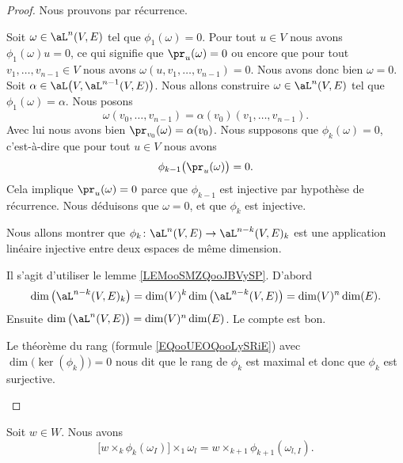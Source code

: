 \begin{proof}
	Nous prouvons par récurrence.
	\begin{subproof}
		\spitem[Injective, \( k=1\)]
		Soit \( \omega\in \aL^n(V,E)\) tel que \( \phi_1(\omega)=0\). Pour tout \( u\in V\) nous avons \( \phi_1(\omega)u=0\), ce qui signifie que \( \pr_u(\omega)=0\) ou encore que pour tout \( v_1,\ldots, v_{n-1}\in V\) nous avons \( \omega(u,v_1,\ldots, v_{n-1})=0\). Nous avons donc bien \( \omega=0\).
		\spitem[Surjective, \( k=1\)]
		Soit \( \alpha\in\aL\big( V,\aL^{n-1}(V,E) \big)\). Nous allons construire \( \omega\in \aL^n(V,E)\) tel que \( \phi_1(\omega)=\alpha\). Nous posons
		\begin{equation}
			\omega(v_0,\ldots, v_{n-1})=\alpha(v_0)(v_1,\ldots, v_{n-1}).
		\end{equation}
		Avec lui nous avons bien \( \pr_{v_0}(\omega)=\alpha(v_0)\).
		\spitem[Injective, \( k=k\)]
		Nous supposons que \( \phi_k(\omega)=0\), c'est-à-dire que pour tout \( u\in V\) nous avons
		\begin{equation}
			\phi_{k-1}\big( \pr_u(\omega) \big)=0.
		\end{equation}
		Cela implique \( \pr_u(\omega)=0\) parce que \( \phi_{k-1}\) est injective par hypothèse de récurrence. Nous déduisons que \( \omega=0\), et que \( \phi_k\) est injective.

		\spitem[Surjective, \( k=k\)]
		Nous allons montrer que \(   \phi_k\colon \aL^n(V,E)\to \aL^{n-k}(V,E)_k  \) est une application linéaire injective entre deux espaces de même dimension.

		Il s'agit d'utiliser le lemme \ref{LEMooSMZQooJBVySP}. D'abord
		\begin{equation}
			\dim\big( \aL^{n-k}(V,E)_k \big)=\dim(V)^k\dim\big( \aL^{n-k}(V,E) \big)=\dim(V)^n\dim(E).
		\end{equation}
		Ensuite \( \dim\big( \aL^n(V,E) \big)=\dim(V)^n\dim(E)\). Le compte est bon.

		Le théorème du rang (formule \eqref{EQooUEOQooLySRiE}) avec \( \dim\big( \ker(\phi_k) \big)=0\) nous dit que le rang de \( \phi_k\) est maximal et donc que \( \phi_k\) est surjective.
	\end{subproof}
\end{proof}

\begin{lemma}       \label{LEMooLTYCooAoMJKD}
	Soit \( w\in W\). Nous avons
	\begin{equation}
		\big[ w\times_k\phi_k(\omega_I) \big]\times_1\omega_l=w\times_{k+1}\phi_{k+1}(\omega_{l,I}).
	\end{equation}
\end{lemma}

